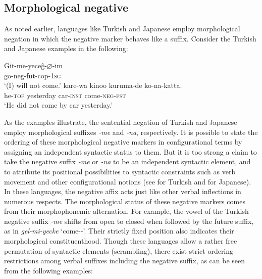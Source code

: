 \documentclass[output=paper
                ,modfonts
                		,nonflat
	        ,collection
	        ,collectionchapter
	        ,collectiontoclongg
 	        ,biblatex
                ,babelshorthands
                ,newtxmath
                ,draftmode
                ,colorlinks, citecolor=brown
]{./langsci/langscibook}
\begin{document}
{\begin{exe}
\begin{xlist}
\begin{exe}
\begin{xlist}
\section{Morphological negative}

As noted earlier, languages like Turkish and Japanese employ morphological negation in which the negative marker behaves like a suffix. Consider
the Turkish and Japanese examples in the following:

\eal
\ex
\label{turkish-jap}
\gll Git-me-yece\~{g}-$\varnothing$-im \\
     go-{\sc neg-fut-cop}-\textsc{1sg} \\
\glt `(I) will not come.'
\ex
\gll kare-wa kinoo kuruma-de ko-na-katta. \\
     he-\textsc{top} yesterday car-\textsc{inst} come-\textsc{neg}-\textsc{pst} \\
\glt `He did not come by car yesterday.'
\zl

\noindent
As the examples illustrate, the sentential negation of Turkish and Japanese employ
morphological suffixes \textit{-me} and \textit{-na},
respectively.
It is possible to state the ordering
of these morphological negative markers in configurational
terms by assigning an independent syntactic status to them.
But it is too strong a claim to
take the negative suffix \textit{-me} or \textit{-na}  to be an independent syntactic element,
and to attribute its positional possibilities to syntactic constraints
such as verb movement and other configurational notions (see \citealt{kelepir} for
Turkish and \citealt{Kato:97,Kato:00} for Japanese).
%
In these languages, the negative affix acts just like
other verbal inflections in numerous respects.
%
%
%
%
%
The morphological status of
these negative markers comes from their morphophonemic alternation.
For example, the vowel of the Turkish negative suffix \textit{-me} shifts from open to closed when followed by the
future suffix, as in \textit{gel-mi-yecke} `come-\NEG-\FUT'.  Their
strictly fixed position also indicates their morphological
constituenthood. Though these languages allow a rather free permutation of
syntactic elements (scrambling), there exist strict ordering restrictions among
verbal suffixes including the negative suffix, as can be seen from
the following examples:


\end{xlist}
\end{exe}
\end{xlist}
\end{exe}}
\end{document}
